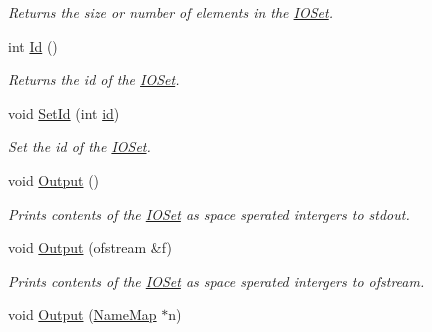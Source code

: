 \begin{DoxyCompactItemize}
\begin{DoxyCompactList}\small\item\em Returns the size or number of elements in the \hyperlink{class_i_o_set}{IOSet}. \item\end{DoxyCompactList}\item 
\hypertarget{class_i_o_set_aab9b694aacc43beacfcb4904478b9161}{
int \hyperlink{class_i_o_set_aab9b694aacc43beacfcb4904478b9161}{Id} ()}
\label{class_i_o_set_aab9b694aacc43beacfcb4904478b9161}

\begin{DoxyCompactList}\small\item\em Returns the id of the \hyperlink{class_i_o_set}{IOSet}. \item\end{DoxyCompactList}\item 
\hypertarget{class_i_o_set_a056e472b53a9a9bf83758ecae590d880}{
void \hyperlink{class_i_o_set_a056e472b53a9a9bf83758ecae590d880}{SetId} (int \hyperlink{class_i_o_set_aec085771a7d9c730275ab9cf08e3feed}{id})}
\label{class_i_o_set_a056e472b53a9a9bf83758ecae590d880}

\begin{DoxyCompactList}\small\item\em Set the id of the \hyperlink{class_i_o_set}{IOSet}. \item\end{DoxyCompactList}\item 
\hypertarget{class_i_o_set_a6dcbafab8dcc9533167e36078ac24e7e}{
void \hyperlink{class_i_o_set_a6dcbafab8dcc9533167e36078ac24e7e}{Output} ()}
\label{class_i_o_set_a6dcbafab8dcc9533167e36078ac24e7e}

\begin{DoxyCompactList}\small\item\em Prints contents of the \hyperlink{class_i_o_set}{IOSet} as space sperated intergers to stdout. \item\end{DoxyCompactList}\item 
\hypertarget{class_i_o_set_ae8a565049da3d6912e5da49af796d457}{
void \hyperlink{class_i_o_set_ae8a565049da3d6912e5da49af796d457}{Output} (ofstream \&f)}
\label{class_i_o_set_ae8a565049da3d6912e5da49af796d457}

\begin{DoxyCompactList}\small\item\em Prints contents of the \hyperlink{class_i_o_set}{IOSet} as space sperated intergers to ofstream. \item\end{DoxyCompactList}\item 
\hypertarget{class_i_o_set_acf92e6034304bd135a7bd42b7b9f9799}{
void \hyperlink{class_i_o_set_acf92e6034304bd135a7bd42b7b9f9799}{Output} (\hyperlink{class_name_map}{NameMap} $\ast$n)}
\label{class_i_o_set_acf92e6034304bd135a7bd42b7b9f9799}


\end{DoxyCompactItemize}
